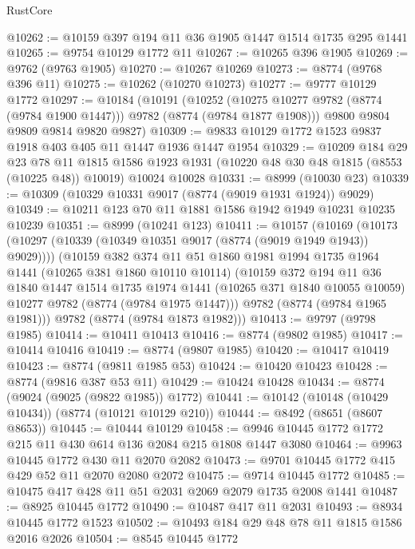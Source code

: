 \begin{lexlean}{RustCore}
\begin{coremodule}
@10262 := @10159 @397 @194 @11 @36 @1905 @1447 @1514 @1735 @295 @1441
@10265 := @9754 @10129 @1772 @11
@10267 := @10265 @396 @1905
@10269 := @9762 (@9763 @1905)
@10270 := @10267 @10269
@10273 := @8774 (@9768 @396 @11)
@10275 := @10262 (@10270 @10273)
@10277 := @9777 @10129 @1772
@10297 := @10184
    (@10191
      (@10252 (@10275 @10277 @9782 (@8774 (@9784 @1900 @1447))) @9782 (@8774 (@9784 @1877 @1908)))
      @9800
      @9804
      @9809
      @9814
      @9820
      @9827)
@10309 := @9833 @10129 @1772 @1523 @9837 @1918 @403 @405 @11 @1447 @1936 @1447 @1954
@10329 := @10209
    @184
    @29
    @23
    @78
    @11
    @1815
    @1586
    @1923
    @1931
    (@10220 @48 @30 @48 @1815 (@8553 (@10225 @48)) @10019)
    @10024
    @10028
@10331 := @8999 (@10030 @23)
@10339 := @10309 (@10329 @10331 @9017 (@8774 (@9019 @1931 @1924)) @9029)
@10349 := @10211 @123 @70 @11 @1881 @1586 @1942 @1949 @10231 @10235 @10239
@10351 := @8999 (@10241 @123)
@10411 := @10157
    (@10169
      (@10173 (@10297 (@10339 (@10349 @10351 @9017 (@8774 (@9019 @1949 @1943)) @9029))))
      (@10159
        @382
        @374
        @11
        @51
        @1860
        @1981
        @1994
        @1735
        @1964
        @1441
        (@10265 @381 @1860 @10110 @10114)
        (@10159
          @372
          @194
          @11
          @36
          @1840
          @1447
          @1514
          @1735
          @1974
          @1441
          (@10265 @371 @1840 @10055 @10059)
          @10277
          @9782
          (@8774 (@9784 @1975 @1447)))
        @9782
        (@8774 (@9784 @1965 @1981)))
      @9782
      (@8774 (@9784 @1873 @1982)))
@10413 := @9797 (@9798 @1985)
@10414 := @10411 @10413
@10416 := @8774 (@9802 @1985)
@10417 := @10414 @10416
@10419 := @8774 (@9807 @1985)
@10420 := @10417 @10419
@10423 := @8774 (@9811 @1985 @53)
@10424 := @10420 @10423
@10428 := @8774 (@9816 @387 @53 @11)
@10429 := @10424 @10428
@10434 := @8774 (@9024 (@9025 (@9822 @1985)) @1772)
@10441 := @10142 (@10148 (@10429 @10434)) (@8774 (@10121 @10129 @210))
@10444 := @8492 (@8651 (@8607 @8653))
@10445 := @10444 @10129
@10458 := @9946 @10445 @1772 @1772 @215 @11 @430 @614 @136 @2084 @215 @1808 @1447 @3080
@10464 := @9963 @10445 @1772 @430 @11 @2070 @2082
@10473 := @9701 @10445 @1772 @415 @429 @52 @11 @2070 @2080 @2072
@10475 := @9714 @10445 @1772
@10485 := @10475 @417 @428 @11 @51 @2031 @2069 @2079 @1735 @2008 @1441
@10487 := @8925 @10445 @1772
@10490 := @10487 @417 @11 @2031
@10493 := @8934 @10445 @1772 @1523
@10502 := @10493 @184 @29 @48 @78 @11 @1815 @1586 @2016 @2026
@10504 := @8545 @10445 @1772

\end{coremodule}
\end{lexlean}
